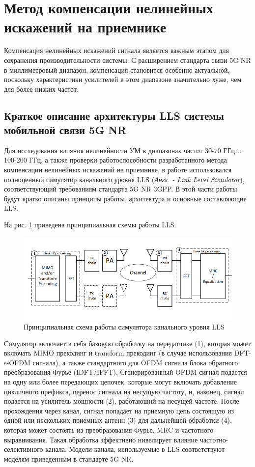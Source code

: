 \section{Метод компенсации нелинейных искажений на приемнике}
Компенсация нелинейных искажений сигнала является важным этапом для
сохранения производительности системы. С расширением стандарта связи 5G NR
в миллиметровый диапазон, компенсация становится особенно актуальной,
поскольку характеристики усилителей в этом диапазоне значительно хуже, чем
для более низких частот.


\subsection{Краткое описание архитектуры LLS системы мобильной связи 5G NR}

Для исследования влияния нелинейности УМ в диапазонах частот 30-70 ГГц и
100-200 ГГц, а также проверки работоспособности разработанного метода
компенсации нелинейных искажений на приемнике, в работе использовался
полноценный симулятор канального уровня LLS (\textit{Англ. - Link Level
Simulator}), соответствующий требованиям стандарта 5G NR 3GPP. В этой части
работы будут кратко описаны принципы работы, архитектура и основные
составляющие LLS. 

На рис. \ref{fig:lls_scheme} приведена принципиальная схемы работы LLS.
\begin{figure}[h!]
    \centering
    \includegraphics[width=0.95\linewidth]{figs/lls_scheme_cut.png}
    \caption{Принципиальная схема работы симулятора канального уровня LLS}
    \label{fig:lls_scheme}
\end{figure}

Симулятор включает в себя базовую обработку на передатчике (1), которая
может включать MIMO прекодинг и transform прекодинг (в случае использования
DFT-s-OFDM сигнала), а также стандартного для OFDM сигнала блока обратного
преобразования Фурье (IDFT/IFFT). Сгенерированный OFDM сигнал подается на
одну или более передающих цепочек, которые могут включать добавление
цикличного префикса, перенос сигнала на несущую частоту, и, наконец, сигнал
подается на усилитель мощности (2), работающий на несущей частоте. После
прохождения через канал, сигнал попадает на приемную цепь состоящую из
одной или нескольких приемных антенн (3) для дальнейшей обработки (4),
которая может состоять из преобразования Фурье, MRC и частотного
выравнивания. Такая обработка эффективно нивелирует влияние
частотно-селективного канала.
Модели канала, используемые в LLS соответствуют моделям приведенным в
стандарте 5G NR.


